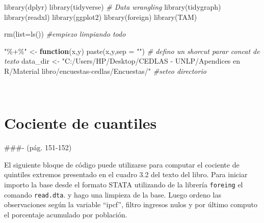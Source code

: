 \documentclass[
]{book}
\newenvironment{Shaded}{\begin{snugshade}}{\end{snugshade}}
\newcommand{\AttributeTok}[1]{\textcolor[rgb]{0.77,0.63,0.00}{#1}}
\newcommand{\CommentTok}[1]{\textcolor[rgb]{0.56,0.35,0.01}{\textit{#1}}}
\newcommand{\ControlFlowTok}[1]{\textcolor[rgb]{0.13,0.29,0.53}{\textbf{#1}}}
\newcommand{\FunctionTok}[1]{\textcolor[rgb]{0.00,0.00,0.00}{#1}}
\newcommand{\NormalTok}[1]{#1}
\newcommand{\OtherTok}[1]{\textcolor[rgb]{0.56,0.35,0.01}{#1}}
\newcommand{\StringTok}[1]{\textcolor[rgb]{0.31,0.60,0.02}{#1}}
\begin{document}
\begin{Shaded}
\begin{Highlighting}[]
\FunctionTok{library}\NormalTok{(dplyr)}
\FunctionTok{library}\NormalTok{(tidyverse) }\CommentTok{\# Data wrangling}
\FunctionTok{library}\NormalTok{(tidygraph)}
\FunctionTok{library}\NormalTok{(readxl)}
\FunctionTok{library}\NormalTok{(ggplot2)}
\FunctionTok{library}\NormalTok{(foreign)}
\FunctionTok{library}\NormalTok{(TAM)}

\FunctionTok{rm}\NormalTok{(}\AttributeTok{list=}\FunctionTok{ls}\NormalTok{())    }\CommentTok{\#empiezo limpiando todo }

\StringTok{"\%+\%"} \OtherTok{\textless{}{-}} \ControlFlowTok{function}\NormalTok{(x,y) }\FunctionTok{paste}\NormalTok{(x,y,}\AttributeTok{sep =} \StringTok{""}\NormalTok{)      }\CommentTok{\# defino un shorcut parar concat de texto}
\NormalTok{data\_dir }\OtherTok{\textless{}{-}} \StringTok{"C:/Users/HP/Desktop/CEDLAS {-} UNLP/Apendices en R/Material libro/encuestas{-}cedlas/Encuestas/"}  \CommentTok{\#seteo directorio }
\end{Highlighting}
\end{Shaded}

~

\hypertarget{cociente-de-cuantiles}{%
\section{Cociente de cuantiles}\label{cociente-de-cuantiles}}

\#\#\#- (pág. 151-152)

El siguiente bloque de código puede utilizarse para computar el cociente de quintiles extremos presentado en el cuadro 3.2 del texto del libro. Para iniciar importo la base desde el formato STATA utilizando de la librería \texttt{foreing} el comando \texttt{read.dta}. y hago una limpieza de la base. Luego ordeno las observaciones según la variable ``ipcf'', filtro ingresos nulos y por último computo el porcentaje acumulado por población.
\end{document}

